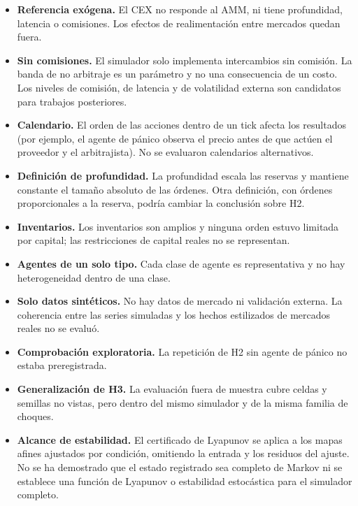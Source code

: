 \begin{itemize}
  \item \textbf{Referencia exógena.} El CEX no responde al AMM, ni tiene profundidad, latencia o comisiones. Los efectos de realimentación entre mercados quedan fuera.
  \item \textbf{Sin comisiones.} El simulador solo implementa intercambios sin comisión. La banda de no arbitraje es un parámetro y no una consecuencia de un costo. Los niveles de comisión, de latencia y de volatilidad externa son candidatos para trabajos posteriores.
  \item \textbf{Calendario.} El orden de las acciones dentro de un tick afecta los resultados (por ejemplo, el agente de pánico observa el precio antes de que actúen el proveedor y el arbitrajista). No se evaluaron calendarios alternativos.
  \item \textbf{Definición de profundidad.} La profundidad escala las reservas y mantiene constante el tamaño absoluto de las órdenes. Otra definición, con órdenes proporcionales a la reserva, podría cambiar la conclusión sobre H2.
  \item \textbf{Inventarios.} Los inventarios son amplios y ninguna orden estuvo limitada por capital; las restricciones de capital reales no se representan.
  \item \textbf{Agentes de un solo tipo.} Cada clase de agente es representativa y no hay heterogeneidad dentro de una clase.
  \item \textbf{Solo datos sintéticos.} No hay datos de mercado ni validación externa. La coherencia entre las series simuladas y los hechos estilizados de mercados reales no se evaluó.
  \item \textbf{Comprobación exploratoria.} La repetición de H2 sin agente de pánico no estaba preregistrada.
  \item \textbf{Generalización de H3.} La evaluación fuera de muestra cubre celdas y semillas no vistas, pero dentro del mismo simulador y de la misma familia de choques.
  \item \textbf{Alcance de estabilidad.} El certificado de Lyapunov se aplica a los mapas afines ajustados por condición, omitiendo la entrada y los residuos del ajuste. No se ha demostrado que el estado registrado sea completo de Markov ni se establece una función de Lyapunov o estabilidad estocástica para el simulador completo.
\end{itemize}
